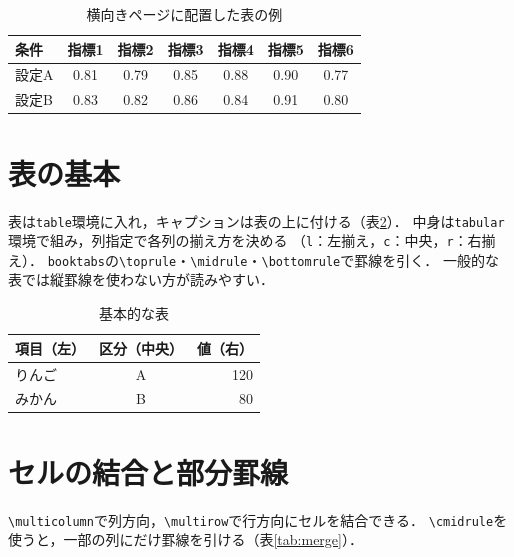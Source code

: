 \begin{landscape}
    \begin{table}[htbp]
        \centering
        \caption{横向きページに配置した表の例}
        \label{tab:landscape}
        \begin{tabular}{lcccccc}\toprule
            条件 & 指標1 & 指標2 & 指標3 & 指標4 & 指標5 & 指標6 \\ \midrule
            設定A & 0.81 & 0.79 & 0.85 & 0.88 & 0.90 & 0.77 \\
            設定B & 0.83 & 0.82 & 0.86 & 0.84 & 0.91 & 0.80 \\ \bottomrule
        \end{tabular}
    \end{table}
\end{landscape}

\section{表の基本}
\label{sec:table}
表は\texttt{table}環境に入れ，キャプションは表の上に付ける（表\ref{tab:basic}）．
中身は\texttt{tabular}環境で組み，列指定で各列の揃え方を決める
（\texttt{l}：左揃え，\texttt{c}：中央，\texttt{r}：右揃え）．
\texttt{booktabs}の\verb|\toprule|・\verb|\midrule|・\verb|\bottomrule|で罫線を引く．
一般的な表では縦罫線を使わない方が読みやすい．

\begin{table}[htbp]
    \centering
    \caption{基本的な表}
    \label{tab:basic}
    \begin{tabular}{lcr}\toprule
        項目（左） & 区分（中央） & 値（右） \\ \midrule
        りんご & A & 120 \\
        みかん & B & 80 \\ \bottomrule
    \end{tabular}
\end{table}

\section{セルの結合と部分罫線}
\label{sec:cellmerge}
\verb|\multicolumn|で列方向，\verb|\multirow|で行方向にセルを結合できる．
\verb|\cmidrule|を使うと，一部の列にだけ罫線を引ける（表\ref{tab:merge}）．

